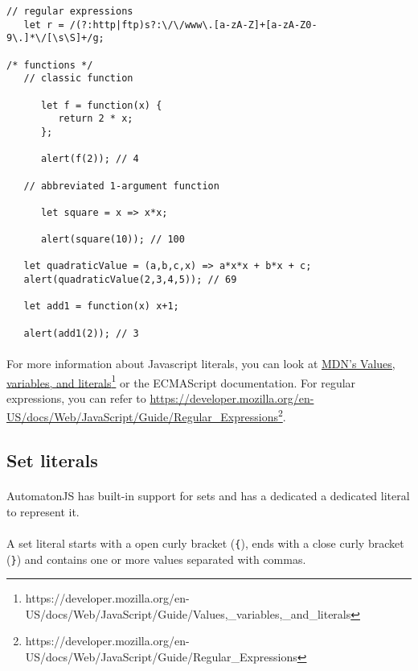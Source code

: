 \documentclass{article}
\begin{document}
\begin{sloppypar}
{\begin{lstlisting}
// regular expressions
   let r = /(?:http|ftp)s?:\/\/www\.[a-zA-Z]+[a-zA-Z0-9\.]*\/[\s\S]+/g;

/* functions */
   // classic function

      let f = function(x) {
         return 2 * x;
      };

      alert(f(2)); // 4

   // abbreviated 1-argument function
   
      let square = x => x*x;

      alert(square(10)); // 100
   
   let quadraticValue = (a,b,c,x) => a*x*x + b*x + c;
   alert(quadraticValue(2,3,4,5)); // 69
   
   let add1 = function(x) x+1;
   
   alert(add1(2)); // 3
\end{lstlisting}
}

      
\paragraph{}
For more information about Javascript literals, you can look at \href{MDN's%20Values+%20variables+%20and%20literals}{MDN's Values, variables, and literals}\footnote{https://developer.mozilla.org/en-US/docs/Web/JavaScript/Guide/Values,\_variables,\_and\_literals} or the ECMAScript documentation.
      For regular expressions, you can refer to \href{https://developer.mozilla.org/en-US/docs/Web/JavaScript/Guide/Regular\_Expressions}{https://developer.mozilla.org/en-US/docs/Web/JavaScript/Guide/Regular\_Expressions}\footnote{https://developer.mozilla.org/en-US/docs/Web/JavaScript/Guide/Regular\_Expressions}.
   

   

\subsection{ Set literals}


\paragraph{}
AutomatonJS has built-in support for sets and has a dedicated a dedicated literal to represent it.

      
\paragraph{}
A set literal starts with a open curly bracket (\lstinline!{!), ends with a close curly bracket (\lstinline!}!) and contains one or more values separated with commas.


\end{sloppypar}
\end{document}
